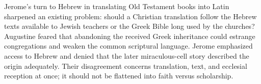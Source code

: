 Jerome's turn to Hebrew in translating Old Testament books into Latin sharpened an existing problem: should a Christian translation follow the Hebrew texts available to Jewish teachers or the Greek Bible long used by the churches? Augustine feared that abandoning the received Greek inheritance could estrange congregations and weaken the common scriptural language. Jerome emphasized access to Hebrew and denied that the later miraculous-cell story described the origin adequately. Their disagreement concerns translation, text, and ecclesial reception at once; it should not be flattened into faith versus scholarship.

